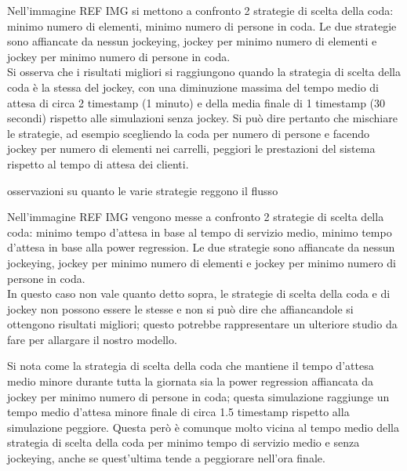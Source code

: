 
Nell'immagine REF IMG si mettono a confronto 2 strategie di scelta della coda: minimo numero di elementi, minimo numero di persone in coda. Le due strategie sono affiancate da nessun jockeying, jockey per minimo numero di elementi e jockey per minimo numero di persone in coda. \\ 
Si osserva che i risultati migliori si raggiungono quando la strategia di scelta della coda è la stessa del jockey, con una diminuzione massima del tempo medio di attesa di circa 2 timestamp (1 minuto) e della media finale di 1 timestamp (30 secondi) rispetto alle simulazioni senza jockey. Si può dire pertanto che mischiare le strategie, ad esempio scegliendo la coda per numero di persone e facendo jockey per numero di elementi nei carrelli, peggiori le prestazioni del sistema rispetto al tempo di attesa dei clienti.


osservazioni su quanto le varie strategie reggono il flusso


Nell'immagine REF IMG vengono messe a confronto 2 strategie di scelta della coda: minimo tempo d'attesa in base al tempo di servizio medio, minimo tempo d'attesa in base alla power regression. Le due strategie sono affiancate da nessun jockeying, jockey per minimo numero di elementi e jockey per minimo numero di persone in coda. \\
In questo caso non vale quanto detto sopra, le strategie di scelta della coda e di jockey non possono essere le stesse e non si può dire che affiancandole si ottengono risultati migliori; questo potrebbe rappresentare un ulteriore studio da fare per allargare il nostro modello.

Si nota come la strategia di scelta della coda che mantiene il tempo d'attesa medio minore durante tutta la giornata sia la power regression affiancata da jockey per minimo numero di persone in coda; questa simulazione raggiunge un tempo medio d'attesa minore finale di circa 1.5 timestamp rispetto alla simulazione peggiore. Questa però è comunque molto vicina al tempo medio della strategia di scelta della coda per minimo tempo di servizio medio e senza jockeying, anche se quest'ultima tende a peggiorare nell'ora finale.

